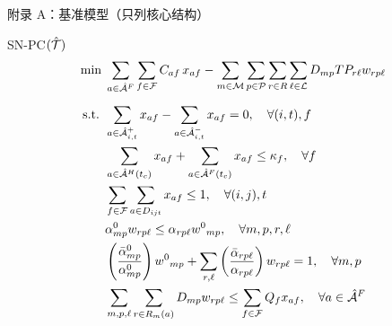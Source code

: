 \documentclass[aspectratio=169,11pt]{ctexbeamer}
\begin{document}
\begin{frame}{附录 A：基准模型（只列核心结构）}
\small
\begin{block}{SN-PC$(\hat{\mathcal{T}})$}
\vspace{-0.25cm}
\begin{align*}
\min\;& \sum_{a\in \full{\flightArc}}\sum_{f\in\fleetSet} \cost_{af}\,\fleetAssignVar_{af}
- \sum_{m\in\marketSet}\sum_{p\in\psgTypeSet}\sum_{r\in\itinInMarket}\sum_{\ell\in\fareClassSet} \demand_{mp}\fare_{r\ell}\shareVar_{rp\ell}\\[0.15cm]
\text{s.t. } & \sum_{a\in \outArcSet{i,t}} \fleetAssignVar_{af} - \sum_{a\in \inArcSet{i,t}} \fleetAssignVar_{af} = 0, \quad \forall (i,t),f \\
& \sum_{a\in \holdingArcTc{\checkTime}} \fleetAssignVar_{af} + \sum_{a\in \flightArcTc{\checkTime}} \fleetAssignVar_{af} \le \fleetAvail_f, \quad \forall f \\
& \sum_{f\in\fleetSet}\sum_{a\in \arcDuringSepTime_{ijt}} \fleetAssignVar_{af} \le 1, \quad \forall (i,j),t \\
& \outAttr_{mp}\shareVar_{rp\ell} \le \attr_{rp\ell}\outsideShareVar_{mp}, \quad \forall m,p,r,\ell \\
& \left(\frac{\adjOutAttr_{mp}}{\outAttr_{mp}}\right) \outsideShareVar_{mp} +
\sum_{r,\ell} \left(\frac{\adjAttr_{rp\ell}}{\attr_{rp\ell}}\right)\shareVar_{rp\ell} = 1, \quad \forall m,p \\
& \sum_{m,p,\ell}\sum_{r\in \itinUsingArc{m}{a}} \demand_{mp}\shareVar_{rp\ell} \le \sum_{f\in\fleetSet}\fleetCap_f\fleetAssignVar_{af}, \quad \forall a\in\full{\flightArc}
\end{align*}
\end{block}
\end{frame}
\end{document}

